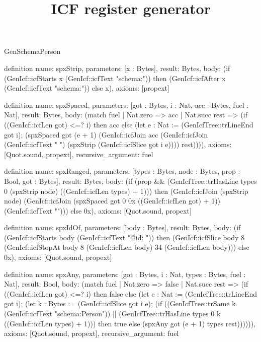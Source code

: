 \begin{lexlean}{GenSchemaPerson}
\title{ICF register generator}
\begin{semanticmodule}
definition{
  name: spxStrip,
  parameters: [x : Bytes],
  result: Bytes,
  body: (if (GenIcf::icfStarts x (GenIcf::icfText "schema:")) then (GenIcf::icfAfter x (GenIcf::icfText "schema:")) else x),
  axioms: [propext]
}

definition{
  name: spxSpaced,
  parameters: [got : Bytes, i : Nat, acc : Bytes, fuel : Nat],
  result: Bytes,
  body: (match fuel
    | Nat.zero => acc
    | Nat.succ rest => (if ((GenIcf::icfLen got) <=? i) then acc else (let e : Nat := (GenIcfTree::trLineEnd got i); (spxSpaced got (e + 1) (GenIcf::icfJoin acc (GenIcf::icfJoin (GenIcf::icfText " ") (spxStrip (GenIcf::icfSlice got i e)))) rest)))),
  axioms: [Quot.sound, propext],
  recursive_argument: fuel
}

definition{
  name: spxRanged,
  parameters: [types : Bytes, node : Bytes, prop : Bool, got : Bytes],
  result: Bytes,
  body: (if (prop && (GenIcfTree::trHasLine types 0 (spxStrip node) ((GenIcf::icfLen types) + 1))) then (GenIcf::icfJoin (spxStrip node) (GenIcf::icfJoin (spxSpaced got 0 0x ((GenIcf::icfLen got) + 1)) (GenIcf::icfText "\n"))) else 0x),
  axioms: [Quot.sound, propext]
}

definition{
  name: spxIdOf,
  parameters: [body : Bytes],
  result: Bytes,
  body: (if (GenIcf::icfStarts body (GenIcf::icfText "\"@id\": \"")) then (GenIcf::icfSlice body 8 (GenIcf::icfStopAt body 8 (GenIcf::icfLen body) 34 (GenIcf::icfLen body))) else 0x),
  axioms: [Quot.sound, propext]
}

definition{
  name: spxAny,
  parameters: [got : Bytes, i : Nat, types : Bytes, fuel : Nat],
  result: Bool,
  body: (match fuel
    | Nat.zero => false
    | Nat.succ rest => (if ((GenIcf::icfLen got) <=? i) then false else (let e : Nat := (GenIcfTree::trLineEnd got i); (let k : Bytes := (GenIcf::icfSlice got i e); (if ((GenIcfTree::trSame k (GenIcf::icfText "schema:Person")) || (GenIcfTree::trHasLine types 0 k ((GenIcf::icfLen types) + 1))) then true else (spxAny got (e + 1) types rest)))))),
  axioms: [Quot.sound, propext],
  recursive_argument: fuel
}


\end{semanticmodule}
\end{lexlean}
